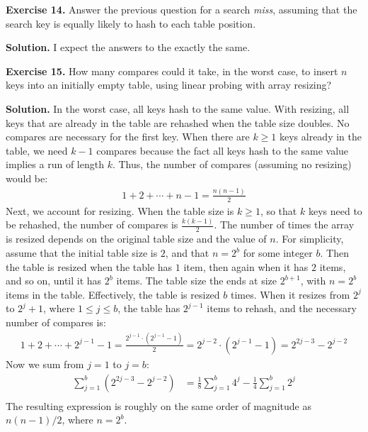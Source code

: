 \documentclass[12pt, a4paper]{article}
\newenvironment{ex}[2][Exercise]
{\par\medskip\noindent \textbf{#1 #2.}}
{\medskip}
\newenvironment{sol}[1][Solution]
{\par\medskip\noindent \textbf{#1.} }
{\medskip}
\begin{document}
	\begin{ex}{14}
		Answer the previous question for a search \emph{miss}, assuming that the search key
		is equally likely to hash to each table position.
	\end{ex}
	\begin{sol}
		I expect the answers to the exactly the same.
	\end{sol}
	\begin{ex}{15}
		How many compares could it take, in the worst case, to insert $n$ keys into an initially
		empty table, using linear probing with array resizing?
	\end{ex}
	\begin{sol}
		In the worst case, all keys hash to the same value. With resizing, all keys that
		are already in the table are rehashed when the table size doubles. No compares are
		necessary for the first key. When there are $k\geq 1$ keys already in the table,
		we need $k-1$ compares because the fact all keys hash to the same value implies
		a run of length $k$. Thus, the number of compares (assuming no resizing) would be:
		\begin{align*}
			1+2+\cdots+n-1=\frac{n(n-1)}{2}
		\end{align*}
		Next, we account for resizing. When the table size is $k\geq 1$, so that $k$ keys
		need to be rehashed, the number of compares is $\frac{k(k-1)}{2}$. The number of
		times the array is resized depends on the original table size and the value of $n$.
		For simplicity, assume that the initial table size is $2$, and that $n=2^b$ for some
		integer $b$. Then the table is resized when the table has $1$ item, then again when
		it has $2$ items, and so on, until it has $2^b$ items. The table size the ends
		at size $2^{b+1}$, with $n=2^b$ items in the table. Effectively, the table is resized
		$b$ times. When it resizes from $2^j$ to $2^j+1$, where $1\leq j\leq b$,
		the table has $2^{j-1}$ items to rehash, and the necessary number of compares is:
		\begin{align*}
			1 + 2 + \cdots + 2^{j-1}-1=\frac{2^{j-1}\cdot (2^{j-1}-1)}{2}=2^{j-2}\cdot (2^{j-1}-1)
			=2^{2j-3}-2^{j-2}
		\end{align*}
		Now we sum from $j=1$ to $j=b$:
		\begin{align*}
			\sum_{j=1}^{b}\left(2^{2j-3}-2^{j-2}\right)&=
			\frac{1}{8}\sum_{j=1}^{b}4^j-\frac{1}{4}\sum_{j=1}^{b}2^j\\
		\end{align*}
		The resulting expression is roughly on the same order of magnitude as $n(n-1)/2$, where $n=2^b$.
	\end{sol}
\end{document}
